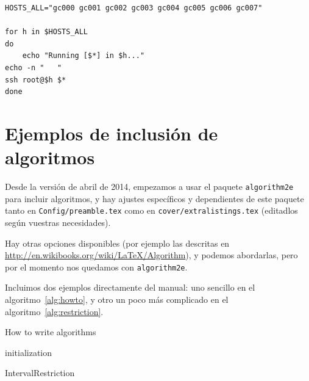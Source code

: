 \documentclass[spanish,openright]{book}
\providecommand{\DontPrintSemicolon}{\dontprintsemicolon}
\begin{document}
\begin{appendices}
\begin{lstlisting}[style=BashInputStyle, numbers=none]
HOSTS_ALL="gc000 gc001 gc002 gc003 gc004 gc005 gc006 gc007"

for h in $HOSTS_ALL
do
	echo "Running [$*] in $h..."
echo -n "   "
ssh root@$h $*
done
\end{lstlisting}


\section{Ejemplos de inclusión de algoritmos}
\label{sec:algoritmos}

Desde la versión de abril de 2014, empezamos a usar el paquete
\texttt{algorithm2e} para incluir algoritmos, y hay ajustes específicos
y dependientes de este paquete tanto en \texttt{Config/preamble.tex}
como en \texttt{cover/extralistings.tex} (editadlos según vuestras
necesidades).

Hay otras opciones disponibles (por ejemplo las descritas en
\url{http://en.wikibooks.org/wiki/LaTeX/Algorithm}), y podemos
abordarlas, pero por el momento nos quedamos con \texttt{algorithm2e}.

Incluimos dos ejemplos directamente del manual: uno sencillo en el
algoritmo~\ref{alg:howto}, y otro un poco más complicado en el
algoritmo~\ref{alg:restriction}.

\begin{algorithm}[H]
\caption{How to write algorithms}
\label{alg:howto}
initialization\;
\end{algorithm}


\begin{algorithm}
\caption{IntervalRestriction\label{IR}}
\label{alg:restriction}
\DontPrintSemicolon
{}
\end{algorithm}









\end{appendices}
\end{document}
